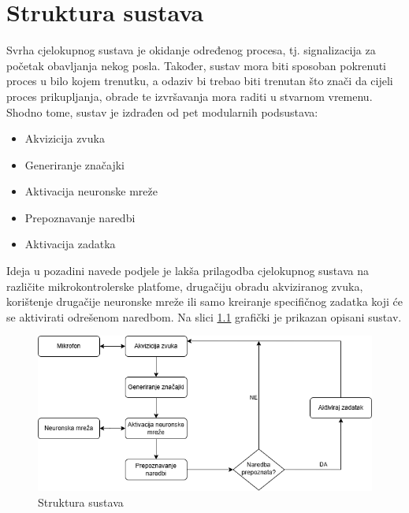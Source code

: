 \chapter{Struktura sustava}
\label{pog:struktura_sustava}

Svrha cjelokupnog sustava je okidanje određenog procesa, tj. signalizacija
za početak obavljanja nekog posla. Također, sustav mora biti sposoban pokrenuti
proces u bilo kojem trenutku, a odaziv bi trebao biti trenutan što
znači da cijeli proces prikupljanja, obrade te izvršavanja mora raditi
u stvarnom vremenu. Shodno tome, sustav je izdrađen od pet modularnih
podsustava:

\begin{itemize}
    \item Akvizicija zvuka
    \item Generiranje značajki
    \item Aktivacija neuronske mreže
    \item Prepoznavanje naredbi
    \item Aktivacija zadatka 
\end{itemize}

Ideja u pozadini navede podjele je lakša prilagodba cjelokupnog
sustava na različite mikrokontrolerske platfome, drugačiju obradu
akviziranog zvuka, korištenje drugačije neuronske mreže ili samo 
kreiranje specifičnog zadatka koji će se aktivirati odrešenom naredbom.
Na slici \ref{pic:struktura_sustava} grafički je prikazan opisani sustav.

\begin{figure}[htb]
    \centering
    \includegraphics[width=0.6\linewidth]{Chapters/struktura_sustava/struktura_sustava.png} 
    \caption{Struktura sustava \cite{flowchart}}
    \label{pic:struktura_sustava}
\end{figure}


